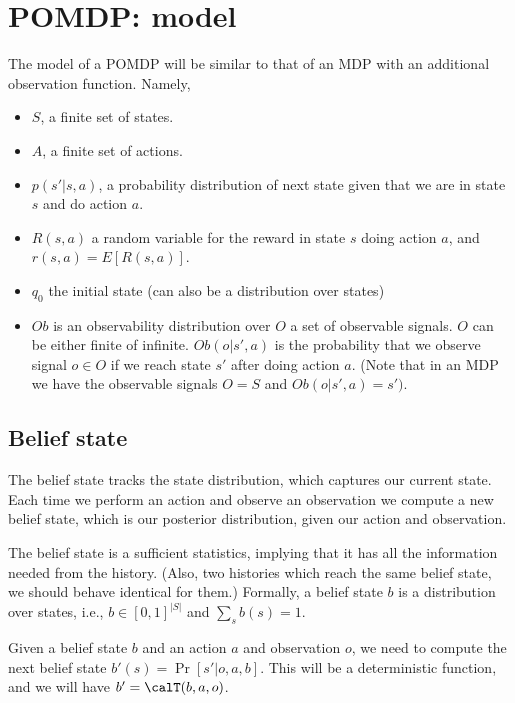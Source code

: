 \section{POMDP: model}

The model of a POMDP will be similar to that of an MDP with an
additional observation function. Namely,
\begin{itemize}
\item
$S$, a finite set of states.
\item
$A$, a finite set of actions.
\item
$p(s'|s,a)$, a probability distribution of next state given that we
are in state $s$ and do action $a$.
\item
$R(s,a)$ a random variable for the reward in state $s$ doing action
$a$, and $r(s,a)=E[R(s,a)]$.
\item
$q_0$ the initial state (can also be a distribution over states)
\item
$Ob$ is an observability distribution over $O$ a set of observable
signals. $O$ can be either finite of infinite. $Ob(o|s',a)$ is the
probability that we observe signal $o\in O$ if we reach state $s'$
after doing action $a$. (Note that in an MDP we have the observable
signals $O=S$ and $Ob(o|s',a)=s')$.
\end{itemize}

\subsection{Belief state}

The belief state tracks the state distribution, which captures our
current state. Each time we perform an action and observe an
observation we compute a new belief state, which is our posterior
distribution, given our action and observation.

The belief state is a sufficient statistics, implying that it has
all the information needed from the history. (Also, two histories
which reach the same belief state, we should behave identical for
them.)
%
Formally, a belief state $b$ is a distribution over states, i.e.,
$b\in[0,1]^{|S|}$ and $\sum_s b(s)=1$.

Given a belief state $b$ and an action $a$ and observation $o$, we
need to compute the next belief state $b'(s)=\Pr[s'|o,a,b]$. This
will be a deterministic function, and we will have
$b'=\calT(b,a,o)$.

